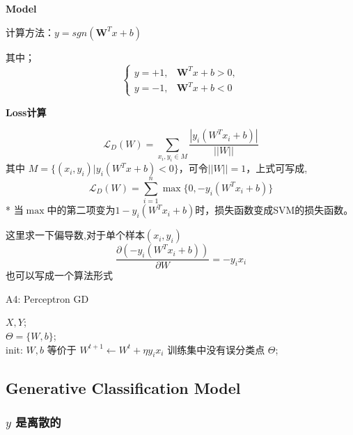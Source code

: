 \documentclass[UTF8]{ctexart}
\numberwithin{equation}{section}
\begin{document}
\textbf{Model}

计算方法：$y=sgn(\mathbf{W}^Tx+b)$

其中；
\begin{equation*}
    \left\{ \begin{aligned}
        y=+1, &\mathbf{W}^Tx+b > 0 , \\ 
        y=-1, &\mathbf{W}^Tx+b<0 
    \end{aligned}
    \right.
\end{equation*}

\textbf{Loss计算}

\begin{equation*}
    \mathcal{L}_D(W) = \sum_{x_i, y_i \in M} \frac{|y_i (W^Tx_i+b)|}{||W||}
\end{equation*}
其中 $M = \{(x_i, y_i) | y_i(W^Tx+b)<0\}$，可令$||W||=1$，上式可写成,
\begin{equation*}
    \mathcal{L}_D(W) = \sum_{i=1}^n\max\{0, -y_i(W^Tx_i+b)\} 
\end{equation*}
* 当$\max$中的第二项变为$1-y_i(W^Tx_i+b)$时，损失函数变成SVM的损失函数。

这里求一下偏导数,对于单个样本$(x_i, y_i)$
\begin{equation*}
    \frac{\partial (-y_i(W^Tx_i + b))}{\partial W} = -y_i x_i
\end{equation*}
也可以写成一个算法形式

\begin{algorithm}[htb]
    \caption{A4: Perceptron GD}
    \label{alg:A4}
    \begin{algorithmic}[1]
    \REQUIRE
    $X, Y$; \\
    \ENSURE 
    $\Theta=\{W, b\}$; \\
    \STATE init: $W, b$
    \REPEAT 
        \STATE 等价于 $W^{t+1} \leftarrow W^t + \eta y_i x_i$
    \ENDIF
    \UNTIL 训练集中没有误分类点
    \RETURN $\Theta$;
    \end{algorithmic}
\end{algorithm}


\subsection{Generative Classification Model}
\subsubsection*{$y$ 是离散的}
\end{document}
